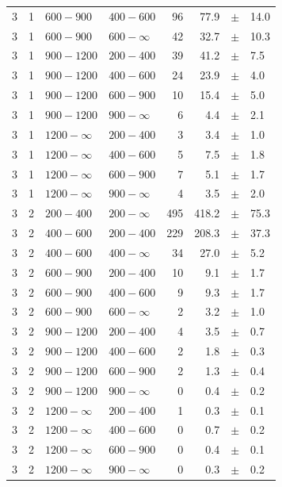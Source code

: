 \begin{table}[!h]
\begin{tabular}{rrllrrcl}
3 & 1 & $ 600- 900$ & $400-600$ &     96 &     77.9 &$\pm$&   14.0 \\
3 & 1 & $ 600- 900$ & $600-\infty$ &     42 &     32.7 &$\pm$&   10.3 \\
3\T & 1 & $ 900-1200$ & $200-400$ &     39 &     41.2 &$\pm$&    7.5 \\
3 & 1 & $ 900-1200$ & $400-600$ &     24 &     23.9 &$\pm$&    4.0 \\
3 & 1 & $ 900-1200$ & $600-900$ &     10 &     15.4 &$\pm$&    5.0 \\
3 & 1 & $ 900-1200$ & $900-\infty$ &      6 &      4.4 &$\pm$&    2.1 \\
3\T & 1 & $1200- \infty$ & $200-400$ &      3 &      3.4 &$\pm$&    1.0 \\
3 & 1 & $1200- \infty$ & $400-600$ &      5 &      7.5 &$\pm$&    1.8 \\
3 & 1 & $1200- \infty$ & $600-900$ &      7 &      5.1 &$\pm$&    1.7 \\
3 & 1 & $1200- \infty$ & $900-\infty$ &      4 &      3.5 &$\pm$&    2.0 \\
3\T & 2 & $ 200- 400$ & $200-\infty$ &    495 &    418.2 &$\pm$&   75.3 \\
3\T & 2 & $ 400- 600$ & $200-400$ &    229 &    208.3 &$\pm$&   37.3 \\
3 & 2 & $ 400- 600$ & $400-\infty$ &     34 &     27.0 &$\pm$&    5.2 \\
3\T & 2 & $ 600- 900$ & $200-400$ &     10 &      9.1 &$\pm$&    1.7 \\
3 & 2 & $ 600- 900$ & $400-600$ &      9 &      9.3 &$\pm$&    1.7 \\
3 & 2 & $ 600- 900$ & $600-\infty$ &      2 &      3.2 &$\pm$&    1.0 \\
3\T & 2 & $ 900-1200$ & $200-400$ &      4 &      3.5 &$\pm$&    0.7 \\
3 & 2 & $ 900-1200$ & $400-600$ &      2 &      1.8 &$\pm$&    0.3 \\
3 & 2 & $ 900-1200$ & $600-900$ &      2 &      1.3 &$\pm$&    0.4 \\
3 & 2 & $ 900-1200$ & $900-\infty$ &      0 &      0.4 &$\pm$&    0.2 \\
3\T & 2 & $1200- \infty$ & $200-400$ &      1 &      0.3 &$\pm$&    0.1 \\
3 & 2 & $1200- \infty$ & $400-600$ &      0 &      0.7 &$\pm$&    0.2 \\
3 & 2 & $1200- \infty$ & $600-900$ &      0 &      0.4 &$\pm$&    0.1 \\
3 & 2 & $1200- \infty$ & $900-\infty$ &      0 &      0.3 &$\pm$&    0.2 \\

\end{tabular}
\end{table}
